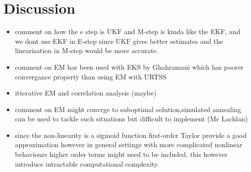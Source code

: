 \documentclass[]{article}
\begin{document}
\section{Discussion}

\begin{itemize}
	\item comment on how the e step is UKF and M-step is kinda like the EKF, and we dont use EKF in E-step since UKF gives better estimates and the linearisation in M-step would be more accurate. 
	\item comment on EM has been used with EKS by Ghahramani which has poorer convergance property than using EM with URTSS
	\item itterative EM and correlation analysis (maybe)
	\item{comment on EM might convrge to suboptimal solution,simulated
annealing can be used to tackle such situations but difficult to implement (Mc Lachlan)}
	\item{since the non-linearity is a sigmoid function first-order Taylor provide a good approximation however in general settings with more complicated nonlinear behaviours higher order terms might need to be included, this however introduce intractable computational complexity.}
\end{itemize}

\end{document}
